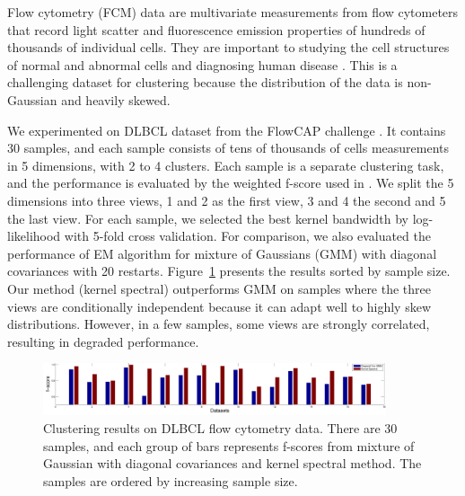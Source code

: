 
Flow cytometry (FCM) data are multivariate measurements from flow cytometers that record light scatter and fluorescence emission properties of hundreds of thousands of individual cells. They are important to studying the cell structures of normal and abnormal cells and diagnosing human disease \cite{cytometry_nature}. This is a challenging dataset for clustering because the distribution of the data is non-Gaussian and heavily skewed.

We experimented on DLBCL dataset from the FlowCAP challenge \cite{cytometry_nature}. It contains 30 samples, and each sample consists of tens of thousands of cells measurements in 5 dimensions, with 2 to 4 clusters. Each sample is a separate clustering task, and the performance is evaluated by the weighted f-score used in \cite{cytometry_nature}. We split the 5 dimensions into three views, 1 and 2 as the first view, 3 and 4 the second and 5 the last view. For each sample, we selected the best kernel bandwidth by log-likelihood with 5-fold cross validation. For comparison, we also evaluated the performance of EM algorithm for mixture of Gaussians (GMM) with diagonal covariances with 20 restarts. Figure~\ref{fig:real_data} presents the results sorted by sample size. Our method (kernel spectral) outperforms GMM on samples where the three views are conditionally independent because it can adapt well to highly skew distributions. However, in a few samples, some views are strongly correlated, resulting in degraded performance. 


\begin{figure}
  \centering
  \includegraphics[width=0.9\textwidth]{../experiment/figure/paired_bar_chat_better} 
   \vspace{-3mm}
  \caption{Clustering results on DLBCL flow cytometry data. There are 30 samples, and each group of bars represents f-scores from mixture of Gaussian with diagonal covariances and kernel spectral method. The samples are ordered by increasing sample size.}\label{fig:real_data}
  \vspace{-3mm}
\end{figure}

